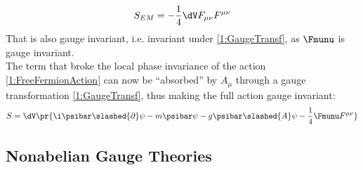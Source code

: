 \begin{equation}
    S_{EM} = -\frac14\dV F_{\mu\nu}F^{\mu\nu} \label{1:FreeMaxwellAction}
\end{equation}
That is also gauge invariant, i.e. invariant under \eqref{1:GaugeTransf}, as $\Fmunu$ is gauge invariant.\\
The term that broke the local phase invariance of the action \eqref{1:FreeFermionAction} can now be ``absorbed'' by $A_\mu$ through a gauge transformation \eqref{1:GaugeTransf}, thus making the full action gauge invariant:
\begin{equation}
    S = \dV\pr{\i\psibar\slashed{\partial}\psi-m\psibar\psi- g \psibar\slashed{A}\psi - \frac14\Fmunu F^{\mu\nu}} \label{1:QEDaction}
\end{equation}

\subsection{Nonabelian Gauge Theories}


